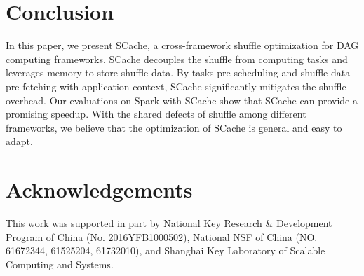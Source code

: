 \section{Conclusion}
In this paper, we present SCache, a cross-framework shuffle optimization for DAG computing frameworks. 
SCache decouples the shuffle from computing tasks and leverages memory to store shuffle data. 
By tasks pre-scheduling and shuffle data pre-fetching with application context, SCache significantly mitigates the shuffle overhead. 
Our evaluations on Spark with SCache show that SCache can provide a promising speedup. 
With the shared defects of shuffle among different frameworks, we believe that the optimization of SCache is general and easy to adapt. 

\section{Acknowledgements}
This work was supported in part by National Key Research \& Development Program of China (No. 2016YFB1000502), National NSF of China (NO. 61672344, 61525204, 61732010), and Shanghai Key Laboratory of Scalable Computing and Systems.